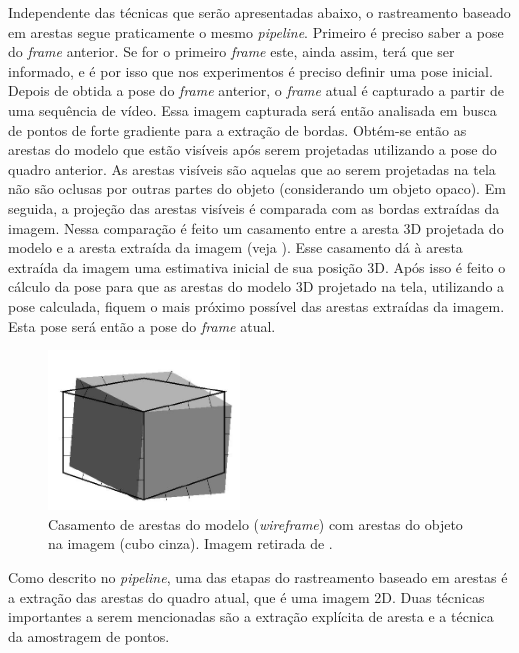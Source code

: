 Independente das técnicas que serão apresentadas abaixo, o rastreamento baseado em arestas segue praticamente o mesmo \emph{pipeline}. Primeiro é preciso saber a pose do \emph{frame} anterior. Se for o primeiro \emph{frame} este, ainda assim, terá que ser informado, e é por isso que nos experimentos é preciso definir uma pose inicial. Depois de obtida a pose do \emph{frame} anterior, o \emph{frame} atual é capturado a partir de uma sequência de vídeo. Essa imagem capturada será então analisada em busca de pontos de forte gradiente para a extração de bordas. Obtém-se então as arestas do modelo que estão visíveis após serem projetadas utilizando a pose do quadro anterior. As arestas visíveis são aquelas que ao serem projetadas na tela não são oclusas por outras partes do objeto (considerando um objeto opaco). Em seguida, a projeção das arestas visíveis é comparada com as bordas extraídas da imagem. Nessa comparação é feito um casamento entre a aresta 3D projetada do modelo e a aresta extraída da imagem (veja ). Esse casamento dá à aresta extraída da imagem uma estimativa inicial de sua posição 3D. Após isso é feito o cálculo da pose para que as arestas do modelo 3D projetado na tela, utilizando a pose calculada, fiquem o mais próximo possível das arestas extraídas da imagem. Esta pose será então a pose do \emph{frame} atual.

\begin{figure}[!ht]
\centering\includegraphics[width=2in]{monografia/cubo_pipeline_drummond}
\caption{Casamento de arestas do modelo (\emph{wireframe}) com arestas do objeto na imagem (cubo cinza). Imagem retirada de \cite{drummondecipolla}.}
\label{cubo_pipeline_drummond}
\end{figure}

Como descrito no \emph{pipeline}, uma das etapas do rastreamento baseado em arestas é a extração das arestas do quadro atual, que é uma imagem 2D. Duas técnicas importantes a serem mencionadas são a extração explícita de aresta \cite{extracao_explicita} e a técnica da amostragem de pontos\cite{drummondecipolla}.

